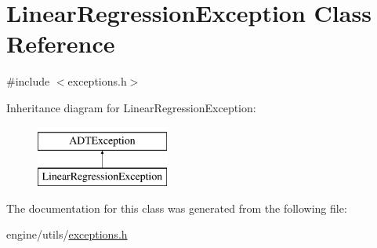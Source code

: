 \hypertarget{classLinearRegressionException}{
\section{LinearRegressionException Class Reference}
\label{classLinearRegressionException}
}


{\ttfamily \#include $<$exceptions.h$>$}

Inheritance diagram for LinearRegressionException:\begin{figure}[H]
\begin{center}
\leavevmode
\includegraphics[height=2cm]{classLinearRegressionException}
\end{center}
\end{figure}


The documentation for this class was generated from the following file:\begin{DoxyCompactItemize}
\item 
engine/utils/\hyperlink{exceptions_8h}{exceptions.h}\end{DoxyCompactItemize}
